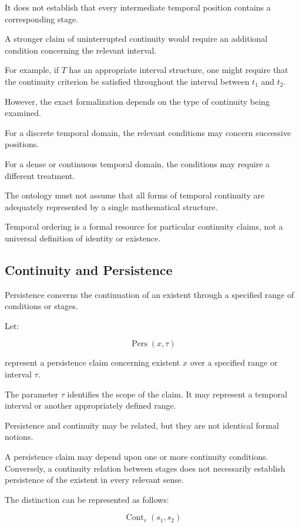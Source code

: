 It does not establish that every
intermediate temporal position
contains a corresponding stage.

A stronger claim of uninterrupted
continuity would require an
additional condition concerning
the relevant interval.

For example, if \(T\) has an
appropriate interval structure,
one might require that the
continuity criterion be satisfied
throughout the interval between
\(t_1\) and \(t_2\).

However, the exact formalization
depends on the type of continuity
being examined.

For a discrete temporal domain,
the relevant conditions may concern
successive positions.

For a dense or continuous temporal
domain, the conditions may require
a different treatment.

The ontology must not assume
that all forms of temporal continuity
are adequately represented by
a single mathematical structure.

Temporal ordering is a formal
resource for particular continuity
claims, not a universal definition
of identity or existence.

\subsection{Continuity and Persistence}

Persistence concerns the continuation
of an existent through a specified
range of conditions or stages.

Let:

\[
    \operatorname{Pers}(x,\tau)
\]

represent a persistence claim concerning
existent \(x\) over a specified range
or interval \(\tau\).

The parameter \(\tau\) identifies
the scope of the claim. It may
represent a temporal interval
or another appropriately defined
range.

Persistence and continuity may
be related, but they are not
identical formal notions.

A persistence claim may depend
upon one or more continuity
conditions. Conversely, a continuity
relation between stages does not
necessarily establish persistence
of the existent in every relevant
sense.

The distinction can be represented
as follows:

\[
    \operatorname{Cont}_{r}(s_1,s_2)
\]


